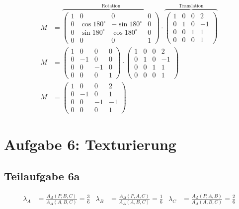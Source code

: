 \documentclass[a4paper]{scrartcl}
\begin{document}
\begin{align}
    M &= \overbrace{\begin{pmatrix}1 & 0 & 0 & 0\\
                        0 & \cos 180^\circ & -\sin 180^\circ & 0\\
                        0 & \sin 180^\circ & \cos 180^\circ  & 0\\
                        0 &              0 &              0  & 1\end{pmatrix}}^{\text{Rotation}}
         \cdot
         \overbrace{
         \begin{pmatrix}1 & 0 & 0 & 2\\
                        0 & 1 & 0 & -1\\
                        0 & 0 & 1 & 1\\
                        0 & 0 & 0 & 1\end{pmatrix}}^{\text{Translation}}\\
    M &= \begin{pmatrix}1 &  0 &  0 & 0\\
                        0 & -1 &  0 & 0\\
                        0 &  0 & -1 & 0\\
                        0 &  0 &  0 & 1\end{pmatrix}
         \cdot
         \begin{pmatrix}1 & 0 & 0 & 2\\
                        0 & 1 & 0 & -1\\
                        0 & 0 & 1 & 1\\
                        0 & 0 & 0 & 1\end{pmatrix}\\
    M &= \begin{pmatrix}1 &  0 &  0 & 2\\
                        0 & -1 &  0 & 1\\
                        0 &  0 & -1 & -1\\
                        0 &  0 &  0 & 1\end{pmatrix}
\end{align}

\section*{Aufgabe 6: Texturierung}
\subsection*{Teilaufgabe 6a}
\begin{align}
    \lambda_A &= \frac{A_\Delta(P,B,C)}{A_\Delta(A,B,C)} = \frac{3}{6}
    &\lambda_B &= \frac{A_\Delta(P,A,C)}{A_\Delta(A,B,C)} = \frac{1}{6}
    &\lambda_C &= \frac{A_\Delta(P,A,B)}{A_\Delta(A,B,C)} = \frac{2}{6}
\end{align}
\end{document}
